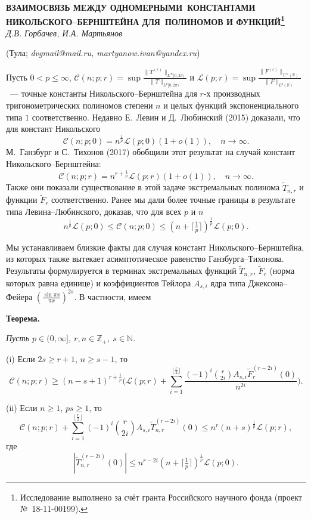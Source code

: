 \begin{center}
    {\bf ВЗАИМОСВЯЗЬ МЕЖДУ ОДНОМЕРНЫМИ~КОНСТАНТАМИ НИКОЛЬСКОГО--БЕРНШТЕЙНА ДЛЯ~ПОЛИНОМОВ И ФУНКЦИЙ\footnote{Исследование выполнено за счёт гранта Российского научного фонда (проект №~18-11-00199).}}\\

    {\it Д.В. Горбачев, И.А. Мартьянов}

    (Тула; {\it dvgmail@mail.ru, martyanow.ivan@yandex.ru})
\end{center}


Пусть $0<p\le \infty$, $\mathcal{C}(n;p;r)=\sup
\frac{\|T^{(r)}\|_{L^{\infty}[0,2\pi)}}{\|T\|_{L^{p}[0,2\pi)}}$ и
$\mathcal{L}(p;r)=\sup
\frac{\|F^{(r)}\|_{L^{\infty}(\mathbb{R})}}{\|F\|_{L^{p}(\mathbb{R})}}$~---
точные константы Никольского--Бернштейна для $r$-х производных
тригонометрических полиномов степени $n$ и целых функций экспоненциального типа
$1$ соответственно. Недавно Е.~Левин и Д.~Любинский (2015) доказали, что для
констант Никольского
\[
\mathcal{C}(n;p;0)=n^{\frac{1}{p}}\mathcal{L}(p;0)(1+o(1)),\quad n\to \infty.
\]
М.~Ганзбург и С.~Тихонов (2017) обобщили этот результат на случай констант
Никольского--Бернштейна:
\[
\mathcal{C}(n;p;r)=n^{r+\frac{1}{p}}\mathcal{L}(p;r)(1+o(1)),\quad n\to \infty.
\]
Также они показали существование в этой задаче экстремальных полинома
$\tilde{T}_{n,r}$ и функции $\tilde{F}_{r}$ соответственно. Ранее мы дали более
точные границы в результате типа Левина--Любинского, доказав, что для всех $p$
и $n$
\[
n^{\frac{1}{p}}\mathcal{L}(p;0)\le \mathcal{C}(n;p;0)\le (n+\lceil
\tfrac{1}{p}\rceil)^{\frac{1}{p}}\mathcal{L}(p;0).
\]

Мы устанавливаем близкие факты для случая констант Никольского--Бернштейна, из
которых также вытекает асимптотическое равенство Ганзбурга--Тихонова.
Результаты формулируется в терминах экстремальных функций $\tilde{T}_{n,r}$,
$\tilde{F}_{r}$ (норма которых равна единице) и коэффициентов Тейлора $A_{s,i}$
ядра типа Джексона--Фейера $(\frac{\sin \pi x}{\pi x})^{2s}$. В частности,
имеем

\textbf{Теорема.} {\it Пусть $p\in (0,\infty]$, $r,n\in \mathbb{Z}_{+}$, $s\in
\mathbb{N}$.

\textup{(i)} Если $2s\ge r+1$, $n\ge s-1$, то
\[
\mathcal{C}(n;p;r)\ge (n-s+1)^{r+\frac{1}{p}}\biggl(\mathcal{L}(p;r)+
\sum_{i=1}^{\lfloor
\frac{r}{2}\rfloor}\frac{(-1)^{i}\binom{r}{2i}A_{s,i}\tilde{F}_{r}^{(r-2i)}(0)}{n^{2i}}\biggr).
\]

\textup{(ii)} Если $n\ge 1$, $ps\ge 1$, то
\[
\mathcal{C}(n;p;r)+\sum_{i=1}^{\lfloor \frac{r}{2}\rfloor}(-1)^{i}\binom{r}{2i}A_{s,i}
\tilde{T}_{n,r}^{(r-2i)}(0)\le n^{r}(n+s)^{\frac{1}{p}}\mathcal{L}(p;r),
\]
где
\[
|\tilde{T}_{n,r}^{(r-2i)}(0)|\le n^{r-2i}(n+\lceil
\tfrac{1}{p}\rceil)^{\frac{1}{p}}\mathcal{L}(p;0).
\]
} 